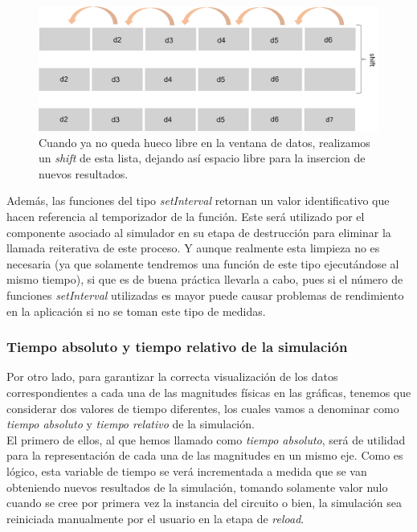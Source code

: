\documentclass[../main.tex]{subfiles}
\begin{document}
\begin{figure}[!h]
    \centering
    \includegraphics[width=\textwidth]{images/ventana_datos_2.png}
    \caption{Cuando ya no queda hueco libre en la ventana de datos, realizamos un \textit{shift} de esta lista, dejando así espacio libre para la insercion de nuevos resultados.}
    \label{fig::ventana_datos_2}
\end{figure}

Además, las funciones del tipo \textit{setInterval} retornan un valor identificativo que hacen referencia al temporizador de la función. Este será utilizado por el componente asociado al simulador en su etapa de destrucción para eliminar la llamada reiterativa de este proceso. Y aunque realmente esta limpieza no es necesaria (ya que solamente tendremos una función de este tipo ejecutándose al mismo tiempo), si que es de buena práctica llevarla a cabo, pues si el número de funciones \textit{setInterval} utilizadas es mayor puede causar problemas de rendimiento en la aplicación si no se toman este tipo de medidas.
\subsubsection{Tiempo absoluto y tiempo relativo de la simulación}
Por otro lado, para garantizar la correcta visualización de los datos correspondientes a cada una de las magnitudes físicas en las gráficas, tenemos que considerar dos valores de tiempo diferentes, los cuales vamos a denominar como \textit{tiempo absoluto} y \textit{tiempo relativo} de la simulación.\\

El primero de ellos, al que hemos llamado como \textit{tiempo absoluto}, será de utilidad para la representación de cada una de las magnitudes en un mismo eje. Como es lógico, esta variable de tiempo se verá incrementada a medida que se van obteniendo nuevos resultados de la simulación, tomando solamente valor nulo cuando se cree por primera vez la instancia del circuito o bien, la simulación sea reiniciada manualmente por el usuario en la etapa de \textit{reload}.\\ 
\end{document}
